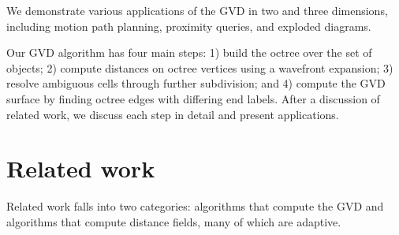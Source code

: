 \documentclass{egpubl}
\begin{document}
We demonstrate various applications of the GVD in two and three dimensions, including motion path planning, proximity queries, and exploded diagrams.


Our GVD algorithm has four main steps: 1) build the octree over the set of objects; 2) compute distances on octree vertices using a wavefront expansion; 3) resolve ambiguous cells through further subdivision; and 4) compute the GVD surface by finding octree edges with differing end labels.  After a discussion of related work, we discuss each step in detail and present applications.

\section{Related work}
Related work falls into two categories: algorithms that compute the GVD and algorithms that compute distance fields, many of which are adaptive.
\end{document}
